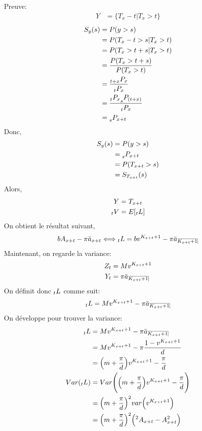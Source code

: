 \documentclass[11pt,french]{report}
\makeatletter
\DeclareRobustCommand{\annuity}[1]{%
\def\arraystretch{0}%
\setlength\arraycolsep{.7pt}%
\setlength\arrayrulewidth{.3pt}%
\begin{array}[b]{@{}c|}\hline
\\[\arraycolsep]%
\scriptstyle #1%
\end{array}%
}
\newcommand{\indiceGauche}[2]{{\vphantom{#2}}_{#1}#2}
\makeatother
\begin{document}
Preuve:
\begin{align*}
Y &= \lbrace T_x - t | T_x > t \rbrace
\end{align*} 
\begin{align*}
S_y(s) &= P(y > s) \\
&= P(T_x - t > s | T_x > t) \\
&= P(T_x > t + s | T_x > t) \\
&= \frac{P(T_x> t +s)}{P(T_x > t)}  \\
&= \frac{\indiceGauche{t+x}{P_x}}{\indiceGauche{t}{P_x}} \\
&= \frac{\indiceGauche{t}{P_x} \indiceGauche{s}{P_{(t+x)}}}{\indiceGauche{t}{P_x}} \\
&= \indiceGauche{s}{P_{x+t}} \\
\end{align*}
Donc,
\begin{align*}
S_y(s) &= P(y>s) \\
&= \indiceGauche{s}{P_{x+t}}\\
&= P(T_{x+t} >s)\\
&=S_{T_{x+t}}(s)\\
\end{align*}
Alors,
\begin{align*}
Y &= T_{x+t} \\
\indiceGauche{t}{V} &= E[\indiceGauche{t}{L}] \\
\end{align*}
On obtient le résultat suivant,
\begin{equation}
b{A_{x+t}} - \pi \ddot{a}_{x+t} \Longleftrightarrow \indiceGauche{t}{L} = bv^{K_{x+t} + 1} - \pi\ddot{a}_{\annuity{K_{x+t}+1}} \\
\end{equation}
Maintenant, on regarde la variance:
\begin{align*}
Z_t &= M v^{K_{x+t}+1}\\
Y_t &= \pi \ddot{a}_{\annuity{K_{x+t}+1}}\\
\end{align*}
On définit donc $\indiceGauche{t}{L}$ comme suit:
\begin{equation}
\indiceGauche{t}{L} = M v^{K_{x+t}+1} -  \pi \ddot{a}_{\annuity{K_{x+t}+1}}
\end{equation}
On développe pour trouver la variance:
\begin{align*}
\indiceGauche{t}{L} &= M v^{K_{x+t}+1} -  \pi \ddot{a}_{\annuity{K_{x+t}+1}} \\
&= M v^{K_{x+t}+1} -  \pi \frac{1 - v^{K_{x+t}+1}}{d} \\
&= \Big(m + \frac{\pi}{d}\Big)v^{K_{x+t}+1} - \frac{\pi}{d}\\
Var(\indiceGauche{t}{L}) &= Var \Bigg( \Big(m + \frac{\pi}{d}\Big)v^{K_{x+t}+1} - \frac{\pi}{d} \Bigg)\\
&=\Big(m + \frac{\pi}{d}\Big)^2 var\Big(v^{K_{x+t}+1}\Big)\\
&= \Big(m + \frac{\pi}{d}\Big)^2 \Big( {}^2A_{x+t} - A_{x+t}^{2} \Big)
\end{align*}
\end{document}
